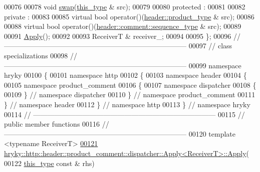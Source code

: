 \begin{DoxyCode}
00076 
00078     \textcolor{keywordtype}{void} \hyperlink{classhryky_1_1http_1_1header_1_1product__comment_1_1dispatcher_1_1_apply_aa32d5970a36b3391346febd126bb0287}{swap}(\hyperlink{classhryky_1_1http_1_1header_1_1product__comment_1_1dispatcher_1_1_apply}{this_type} & src);
00079 
00080 \textcolor{keyword}{protected} :
00081 
00082 \textcolor{keyword}{private} :
00083 
00085     \textcolor{keyword}{virtual} \textcolor{keywordtype}{bool} operator()(\hyperlink{classhryky_1_1http_1_1header_1_1product_1_1_entity}{header::product_type} & src);
00086 
00088     \textcolor{keyword}{virtual} \textcolor{keywordtype}{bool} operator()(\hyperlink{classhryky_1_1http_1_1header_1_1comment_1_1_sequence}{header::comment::sequence_type} & src);
00089 
00091     \hyperlink{classhryky_1_1http_1_1header_1_1product__comment_1_1dispatcher_1_1_apply}{Apply}();
00092 
00093     ReceiverT & receiver\_;
00094 
00095 \};
00096 \textcolor{comment}{//
      ------------------------------------------------------------------------------}
00097 \textcolor{comment}{// class specializations}
00098 \textcolor{comment}{//
      ------------------------------------------------------------------------------}
00099 \textcolor{keyword}{namespace }hryky
00100 \{
00101 \textcolor{keyword}{namespace }http
00102 \{
00103 \textcolor{keyword}{namespace }header
00104 \{
00105 \textcolor{keyword}{namespace }product\_comment
00106 \{
00107 \textcolor{keyword}{namespace }dispatcher
00108 \{
00109 \} \textcolor{comment}{// namespace dispatcher}
00110 \} \textcolor{comment}{// namespace product\_comment}
00111 \} \textcolor{comment}{// namespace header}
00112 \} \textcolor{comment}{// namespace http}
00113 \} \textcolor{comment}{// namespace hryky}
00114 \textcolor{comment}{//
      ------------------------------------------------------------------------------}
00115 \textcolor{comment}{// public member functions}
00116 \textcolor{comment}{//
      ------------------------------------------------------------------------------}
00120 \textcolor{comment}{}\textcolor{keyword}{template} <\textcolor{keyword}{typename} ReceiverT>
\hypertarget{http__header__product__comment__dispatcher__apply_8h_source_l00121}{}\hyperlink{classhryky_1_1http_1_1header_1_1product__comment_1_1dispatcher_1_1_apply_a63f31b38e049e0786bff03f3cdd83507}{00121} \hyperlink{classhryky_1_1http_1_1header_1_1product__comment_1_1dispatcher_1_1_apply}{hryky::http::header::product_comment::dispatcher::Apply<ReceiverT>::Apply}(
00122     \hyperlink{classhryky_1_1http_1_1header_1_1product__comment_1_1dispatcher_1_1_apply}{this_type} \textcolor{keyword}{const} & rhs)

\end{DoxyCode}

